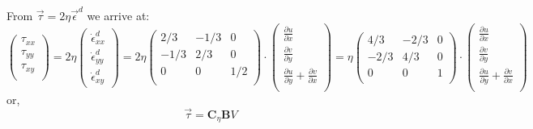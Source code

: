 From $\vec{\tau} = 2\eta \vec{\epsilon}^d$ we arrive at:
\[
\left(
\begin{array}{c}
\tau_{xx}\\
\tau_{yy}\\
\tau_{xy}\\
\end{array}
\right)
=
2\eta
\left(
\begin{array}{c}
\dot{\epsilon}_{xx}^d \\
\dot{\epsilon}_{yy}^d \\
\dot{\epsilon}_{xy}^d 
\end{array}
\right)
=2 \eta
\left(
\begin{array}{ccc}
2/3 & -1/3& 0 \\
-1/3 & 2/3 & 0 \\
0 & 0 & 1/2 \\
\end{array}
\right)
\cdot 
\left(
\begin{array}{c}
\frac{\partial u}{\partial x} \\ 
\frac{\partial v}{\partial y} \\ 
\frac{\partial u}{\partial y}\! +\! \frac{\partial v}{\partial x} \\
\end{array}
\right)
=
\eta
\left(
\begin{array}{ccc}
4/3 & -2/3& 0 \\
-2/3 & 4/3 & 0 \\
0 & 0 & 1 \\
\end{array}
\right)
\cdot 
\left(
\begin{array}{c}
\frac{\partial u}{\partial x} \\ 
\frac{\partial v}{\partial y} \\ 
\frac{\partial u}{\partial y}\! +\! \frac{\partial v}{\partial x} \\
\end{array}
\right)
\]
or, 
\[
\vec{\tau} = {\bm C}_\eta {\bm B} V
\]


















